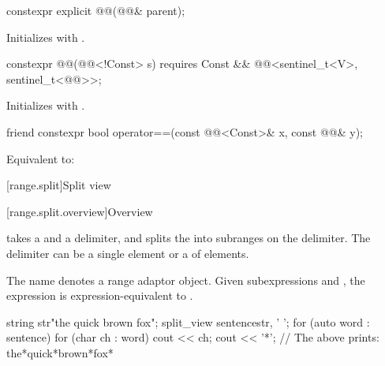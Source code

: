 %
\begin{itemdecl}
constexpr explicit @@(@@& parent);
\end{itemdecl}

\begin{itemdescr}
\pnum
\effects
Initializes  with .
\end{itemdescr}

%
\begin{itemdecl}
constexpr @@(@@<!Const> s)
  requires Const && @@<sentinel_t<V>, sentinel_t<@@>>;
\end{itemdecl}

\begin{itemdescr}
\pnum
\effects
Initializes  with .
\end{itemdescr}


\begin{itemdecl}
friend constexpr bool operator==(const @@<Const>& x, const @@& y);
\end{itemdecl}

\begin{itemdescr}
\pnum
\effects
Equivalent to: 
\end{itemdescr}

[range.split]{Split view}

[range.split.overview]{Overview}

\pnum
{} takes a  and a delimiter, and splits
the  into subranges on the delimiter. The delimiter can be
a single element or a  of elements.

\pnum
The name  denotes a
range adaptor object.
Given subexpressions  and ,
the expression  is expression-equivalent to
.

\pnum
\begin{example}
\begin{codeblock}
string str{"the quick brown fox"};
split_view sentence{str, ' '};
for (auto word : sentence) {
  for (char ch : word)
    cout << ch;
  cout << '*';
}
// The above prints: the*quick*brown*fox*
\end{codeblock}
\end{example}


